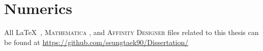 
\chapter{Numerics}
\label{sec:ap8}


All \LaTeX \ , \textsc{Mathematica} , and \textsc{Affinity Designer}  files related to this thesis can be found at \href{https://github.com/seungtaek90/Dissertation/}{https://github.com/seungtaek90/Dissertation/}

